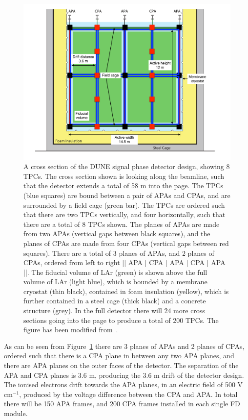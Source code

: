 \begin{figure}
  \centering
  \includegraphics[width=\textwidth]{FarDetectorSchem}
  \caption[A cross section of the DUNE single phase detector design, showing 8 TPCs]
          {A cross section of the DUNE signal phase detector design, showing 8 TPCs. The cross section shown is looking along the beamline, such that the detector extends a total of 58 m into the page. The TPCs (blue squares) are bound between a pair of APAs and CPAs, and are surrounded by a field cage (green bar). The TPCs are ordered such that there are two TPCs vertically, and four horizontally, such that there are a total of 8 TPCs shown. The planes of APAs are made from two APAs (vertical gaps between black squares), and the planes of CPAs are made from four CPAs (vertical gaps between red squares). There are a total of 3 planes of APAs, and 2 planes of CPAs, ordered from left to right || APA | CPA | APA | CPA | APA ||. The fiducial volume of LAr (green) is shown above the full volume of LAr (light blue), which is bounded by a membrane cryostat (thin black), contained in foam insulation (yellow), which is further contained in a steel cage (thick black) and a concrete structure (grey). In the full detector there will 24 more cross sections going into the page to produce a total of 200 TPCs. The figure has been modified from~\citep{DUNECDR_V4}.}
  \label{fig:DUNE_SP_Schem}
\end{figure}

As can be seen from Figure~\ref{fig:DUNE_SP_Schem} there are 3 planes of APAs and 2 planes of CPAs, ordered such that there is a CPA plane in between any two APA planes, and there are APA planes on the outer faces of the detector. The separation of the APA and CPA planes is 3.6 m, producing the 3.6 m drift of the detector design. The ionised electrons drift towards the APA planes, in an electric field of 500 V cm$^{-1}$, produced by the voltage difference between the CPA and APA. In total there will be 150 APA frames, and 200 CPA frames installed in each single FD module. \\

